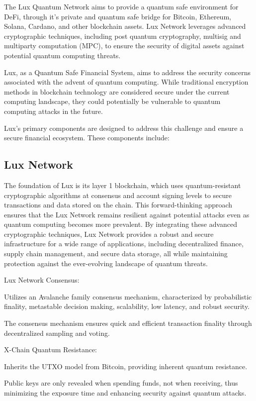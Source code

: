 \documentclass[11pt]{article}
\begin{document}
The Lux Quantum Network aims to provide a quantum safe environment for DeFi, through it's private and quantum safe bridge for Bitcoin, Ethereum, Solana, Cardano, and other blockchain assets. Lux Network leverages advanced cryptographic techniques, including post quantum cryptography, multisig and multiparty computation (MPC), to ensure the security of digital assets against potential quantum computing threats.


Lux, as a Quantum Safe Financial System, aims to address the security concerns associated with the advent of quantum computing. While traditional encryption methods in blockchain technology are considered secure under the current computing landscape, they could potentially be vulnerable to quantum computing attacks in the future.


Lux's primary components are designed to address this challenge and ensure a secure financial ecosystem. These components include:


\subsection{Lux Network}

The foundation of Lux is its layer 1 blockchain, which uses quantum-resistant cryptographic algorithms at consensus and account signing levels to secure transactions and data stored on the chain. This forward-thinking approach ensures that the Lux Network remains resilient against potential attacks even as quantum computing becomes more prevalent. By integrating these advanced cryptographic techniques, Lux Network provides a robust and secure infrastructure for a wide range of applications, including decentralized finance, supply chain management, and secure data storage, all while maintaining protection against the ever-evolving landscape of quantum threats.


Lux Network Consensus:


Utilizes an Avalanche family consensus mechanism, characterized by probabilistic finality, metastable decision making, scalability, low latency, and robust security.


The consensus mechanism ensures quick and efficient transaction finality through decentralized sampling and voting.


X-Chain Quantum Resistance:


Inherits the UTXO model from Bitcoin, providing inherent quantum resistance.


Public keys are only revealed when spending funds, not when receiving, thus minimizing the exposure time and enhancing security against quantum attacks.
\end{document}
